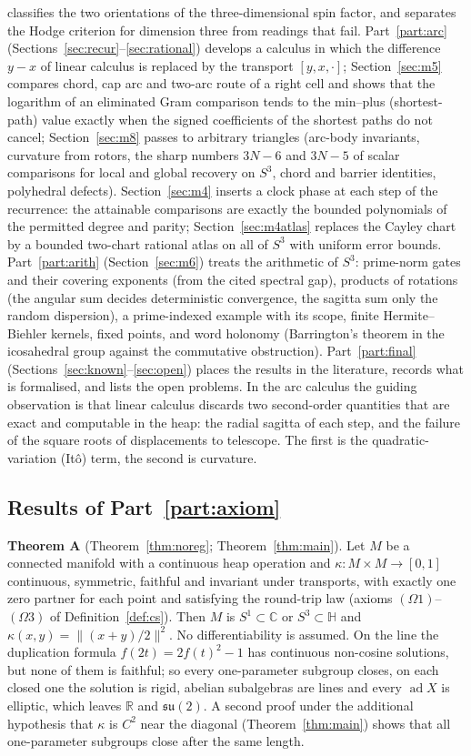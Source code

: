 \documentclass[11pt,reqno]{amsart}
\theoremstyle{definition}
\theoremstyle{remark}
\numberwithin{equation}{section}
\newcommand{\R}{\mathbb{R}}
\newcommand{\C}{\mathbb{C}}
\newcommand{\HH}{\mathbb{H}}
\newcommand{\su}{\mathfrak{su}}
\newcommand{\ad}{\operatorname{ad}}
\newcommand{\hp}[3]{[#1,#2,#3]}
\begin{document}
classifies the two orientations of the three-dimensional spin factor, and separates the Hodge criterion for dimension three from
readings that fail.  Part~\ref{part:arc} (Sections~\ref{sec:recur}--\ref{sec:rational}) develops a
calculus in which the difference $y-x$ of linear calculus is replaced by the transport $\hp y x\cdot$; Section~\ref{sec:m5} compares
chord, cap arc and two-arc route of a right cell and shows that the logarithm of an eliminated Gram comparison tends to the min--plus
(shortest-path) value exactly when the signed coefficients of the shortest paths do not cancel; Section~\ref{sec:m8} passes to arbitrary
triangles (arc-body invariants, curvature from rotors, the sharp numbers $3N-6$ and $3N-5$ of scalar comparisons for local and global
recovery on $S^3$, chord and barrier identities, polyhedral defects).  Section~\ref{sec:m4} inserts a clock
phase at each step of the recurrence: the attainable comparisons are exactly the bounded polynomials of the permitted degree and parity;
Section~\ref{sec:m4atlas} replaces the Cayley chart by a bounded two-chart rational atlas on all of $S^3$ with uniform error bounds.
Part~\ref{part:arith} (Section~\ref{sec:m6}) treats the arithmetic of $S^3$: prime-norm gates and their covering exponents (from the
cited spectral gap), products of rotations (the angular sum decides deterministic convergence, the sagitta sum only the random
dispersion), a prime-indexed example with its scope, finite Hermite--Biehler kernels, fixed points, and word holonomy (Barrington's
theorem in the icosahedral group against the commutative obstruction).  Part~\ref{part:final}
(Sections~\ref{sec:known}--\ref{sec:open}) places the results in the literature, records what is formalised, and lists the open problems.
In the arc calculus the guiding observation is that linear calculus discards two second-order quantities
that are exact and computable in the heap: the radial sagitta of each step, and the failure of the
square roots of displacements to telescope.  The first is the quadratic-variation (It\^o) term, the
second is curvature.

\subsection{Results of Part~\ref{part:axiom}}
\noindent\textbf{Theorem A} (Theorem~\ref{thm:noreg}; Theorem~\ref{thm:main}).  Let $M$ be a connected manifold with a
continuous heap operation and $\kappa\colon M\times M\to[0,1]$ continuous, symmetric, faithful and invariant under
transports, with exactly one zero partner for each point and satisfying the round-trip law (axioms $(\Omega1)$--$(\Omega3)$ of
Definition~\ref{def:cs}).  Then $M$ is $S^1\subset\C$ or
$S^3\subset\HH$ and $\kappa(x,y)=\lVert(x+y)/2\rVert^2$.  No differentiability is assumed.  On the line the duplication formula
$f(2t)=2f(t)^2-1$ has continuous non-cosine solutions, but none of them is faithful; so every one-parameter subgroup closes,
on each closed one the solution is rigid, abelian subalgebras are lines and every $\ad X$ is elliptic, which leaves $\R$
and $\su(2)$.  A second proof under the additional hypothesis that $\kappa$ is $C^2$ near the diagonal
(Theorem~\ref{thm:main}) shows that all one-parameter subgroups close after the same length.
\end{document}
